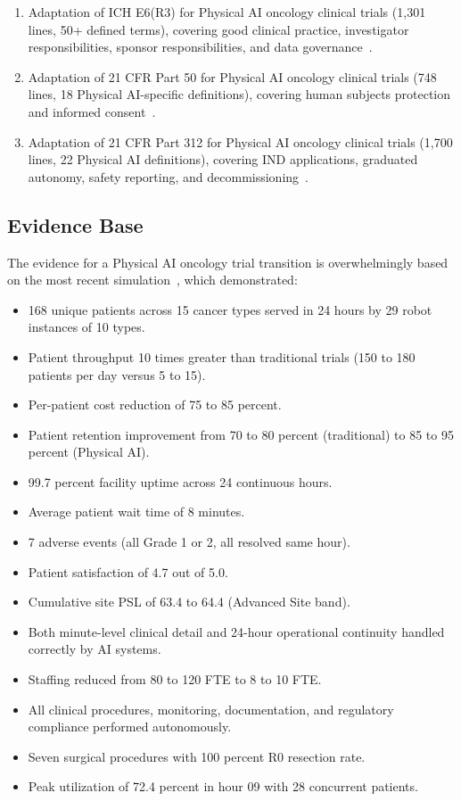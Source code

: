 \documentclass[11pt,letterpaper]{article}
\begin{document}
\begin{enumerate}[label=(\arabic*)]
\item Adaptation of ICH E6(R3) for Physical AI oncology clinical trials
  (1,301 lines, 50+ defined terms), covering good clinical practice,
  investigator responsibilities, sponsor responsibilities, and data
  governance~\cite{iche6r3adapt}.
\item Adaptation of 21 CFR Part 50 for Physical AI oncology clinical trials
  (748 lines, 18 Physical AI-specific definitions), covering human subjects
  protection and informed consent~\cite{cfr50adapt}.
\item Adaptation of 21 CFR Part 312 for Physical AI oncology clinical trials
  (1,700 lines, 22 Physical AI definitions), covering IND applications,
  graduated autonomy, safety reporting, and
  decommissioning~\cite{cfr312adapt}.
\end{enumerate}

\subsection{Evidence Base}

The evidence for a Physical AI oncology trial transition is overwhelmingly
based on the most recent simulation~\cite{newtrial2026}, which demonstrated:

\begin{itemize}
\item 168 unique patients across 15 cancer types served in 24 hours by 29
  robot instances of 10 types.
\item Patient throughput 10 times greater than traditional trials (150 to 180
  patients per day versus 5 to 15).
\item Per-patient cost reduction of 75 to 85 percent.
\item Patient retention improvement from 70 to 80 percent (traditional) to
  85 to 95 percent (Physical AI).
\item 99.7 percent facility uptime across 24 continuous hours.
\item Average patient wait time of 8 minutes.
\item 7 adverse events (all Grade 1 or 2, all resolved same hour).
\item Patient satisfaction of 4.7 out of 5.0.
\item Cumulative site PSL of 63.4 to 64.4 (Advanced Site band).
\item Both minute-level clinical detail and 24-hour operational continuity
  handled correctly by AI systems.
\item Staffing reduced from 80 to 120 FTE to 8 to 10 FTE.
\item All clinical procedures, monitoring, documentation, and regulatory
  compliance performed autonomously.
\item Seven surgical procedures with 100 percent R0 resection rate.
\item Peak utilization of 72.4 percent in hour 09 with 28 concurrent patients.
\end{itemize}
\end{document}
